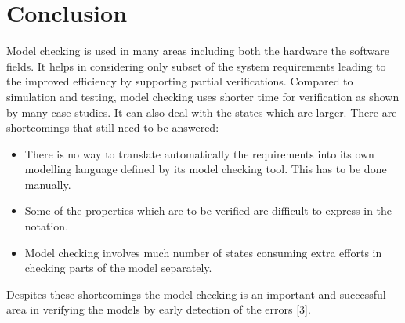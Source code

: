 \documentclass{article}
\begin{document}
\section{Conclusion}


Model checking is used in many areas including both the hardware the software fields. It helps in considering only subset of the system requirements leading to the improved efficiency by supporting partial verifications. Compared to simulation and testing, model checking uses shorter time for verification as shown by many case studies. It can also deal with the states which are larger. 
There are shortcomings that still need to be answered:
\begin{itemize}
\item	There is no way to translate automatically the requirements into its own modelling language defined by its model checking tool. This has to be done manually.
\item	Some of the properties which are to be verified are difficult to express in the notation.
\item	Model checking involves much number of states consuming extra efforts in checking parts of the model separately. 
\end{itemize}
Despites these shortcomings the model checking is an important and successful area in verifying the models by early detection of the errors [3].
\newpage
\end{document}

